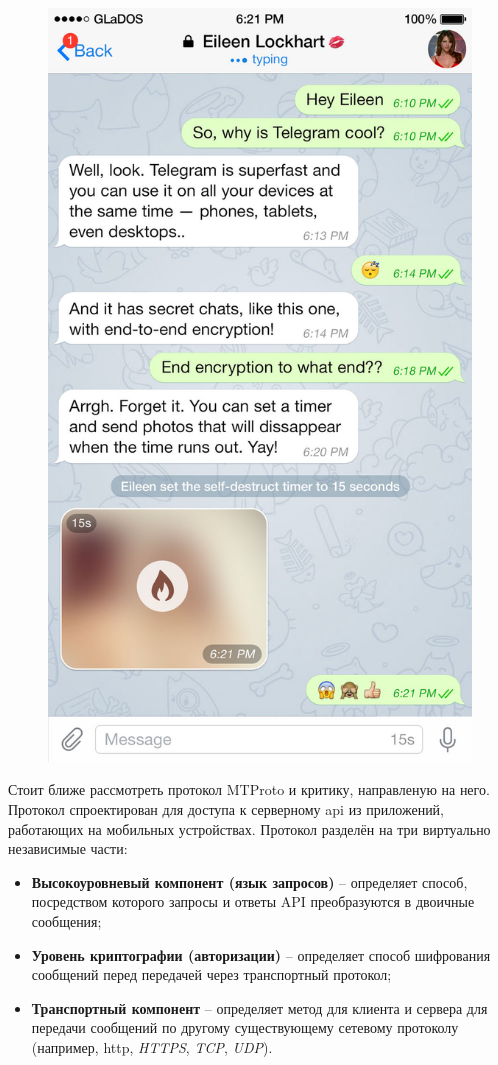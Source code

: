 \begin{figure}[h]
\begin{minipage}{.5\textwidth}
  \label{sec:analysis:research:analogs:telegram:dialogues}
\end{minipage}%
\begin{minipage}{.5\textwidth}
  \centering
  \includegraphics[width=.8\linewidth]{inc/img/tg-secretchat.jpg}
  \label{sec:analysis:research:analogs:telegram:secretchat}
\end{minipage}
\end{figure}

Стоит ближе рассмотреть протокол MTProto и критику, направленую на него. Протокол спроектирован для доступа к серверному \gls{api} из приложений, работающих на мобильных устройствах. 
Протокол разделён на три виртуально независимые части: 
\begin{itemize}
	\item \textbf{Высокоуровневый компонент (язык запросов)} -- определяет способ, посредством которого запросы и ответы API преобразуются в двоичные сообщения;
	\item \textbf{Уровень криптографии (авторизации)} -- определяет способ шифрования сообщений перед передачей через транспортный протокол;
	\item \textbf{Транспортный компонент} -- определяет метод для клиента и сервера для передачи сообщений по другому существующему сетевому протоколу (например, \gls{http}, \textit{HTTPS}, \textit{TCP}, \textit{UDP}).
\end{itemize}

